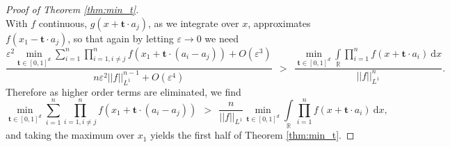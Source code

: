 \documentclass[11pt,reqno]{amsart}
\numberwithin{equation}{section}
\theoremstyle{plain}
\newcommand{\R}{\ensuremath{\mathbb{R}}}
\newcommand{\e}{\varepsilon}
\begin{document}
\begin{proof}[Proof of Theorem \ref{thm:min_t}]
\begin{equation}
\end{equation}
With $f$ continuous, $g(x+\mathbf{t}\cdot a_j)$, as we integrate over $x$, approximates $f(x_1-\mathbf{t}\cdot a_j)$, so that again by letting $\e \to 0$ we need
\begin{equation}
    \frac{\e^2\min\limits_{\mathbf{t}\in[0,1]^d}\displaystyle\sum\limits_{i=1}^{n}\prod\limits_{i=1,i\neq j}^{n}f(x_1+\mathbf{t}\cdot (a_i-a_j))+O(\e^3)}{n\e^2||f||_{L^1}^{n-1}+O(\e^4)}\ \ > \ \  \frac{\min\limits_{\mathbf{t}\in[0,1]^d}\displaystyle\int\limits_{\R}\prod\limits_{i=1}^{n}f(x+\mathbf{t}\cdot a_i)\ \mathrm{d}x}{||f||_{L^1}^{n}}.
\end{equation}
Therefore as higher order terms are eliminated, we find
\begin{equation}
    \min\limits_{\mathbf{t}\in[0,1]^d}\sum\limits_{i=1}^{n}\prod\limits_{i=1,i\neq j}^{n}f(x_1+\mathbf{t}\cdot (a_i-a_j))\ \ > \ \  \frac{n}{||f||_{L^1}}\min\limits_{\mathbf{t}\in[0,1]^d}\int\limits_{\R}\prod\limits_{i=1}^{n}f(x+\mathbf{t}\cdot a_i)\ \mathrm{d}x,
\end{equation}
and taking the maximum over $x_1$ yields the first half of Theorem \ref{thm:min_t}.


\end{proof}
\end{document}
